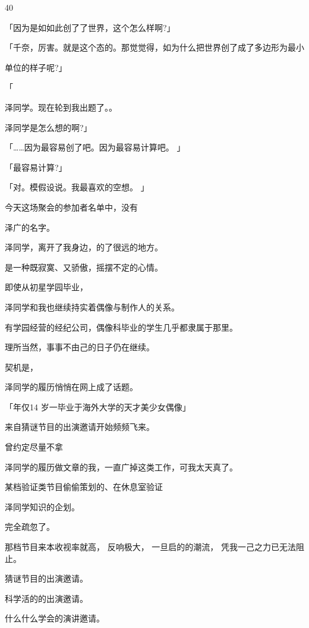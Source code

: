 40\par
「因为是如如此创了了世界，这个怎么样啊?」\par
「千奈，厉害。就是这个态的。那觉觉得，如为什么把世界创了成了多边形为最小\par
单位的样子呢?」\par
「\par
泽同学。现在轮到我出题了。。\par
泽同学是怎么想的啊?」\par
「……因为最容易创了吧。因为最容易计算吧。 」\par
「最容易计算?」\par
「对。模假设说。我最喜欢的空想。 」\par
今天这场聚会的参加者名单中，没有\par
泽广的名字。\par
泽同学，离开了我身边，的了很远的地方。\par
是一种既寂寞、又骄傲，摇摆不定的心情。\par
即使从初星学园毕业，\par
泽同学和我也继续持实着偶像与制作人的关系。\par
有学园经营的经纪公司，偶像科毕业的学生几乎都隶属于那里。\par
理所当然，事事不由己的日子仍在继续。\par
契机是，\par
泽同学的履历悄悄在网上成了话题。\par
「年仅14 岁一毕业于海外大学的天才美少女偶像」\par
来自猜谜节目的出演邀请开始频频飞来。\par
曾约定尽量不拿\par
泽同学的履历做文章的我，一直广掉这类工作，可我太天真了。\par
某档验证类节目偷偷策划的、在休息室验证\par
泽同学知识的企划。\par
完全疏忽了。\par
那档节目来本收视率就高， 反响极大， 一旦启的的潮流， 凭我一己之力已无法阻止。\par
猜谜节目的出演邀请。\par
科学活的的出演邀请。\par
什么什么学会的演讲邀请。\par

